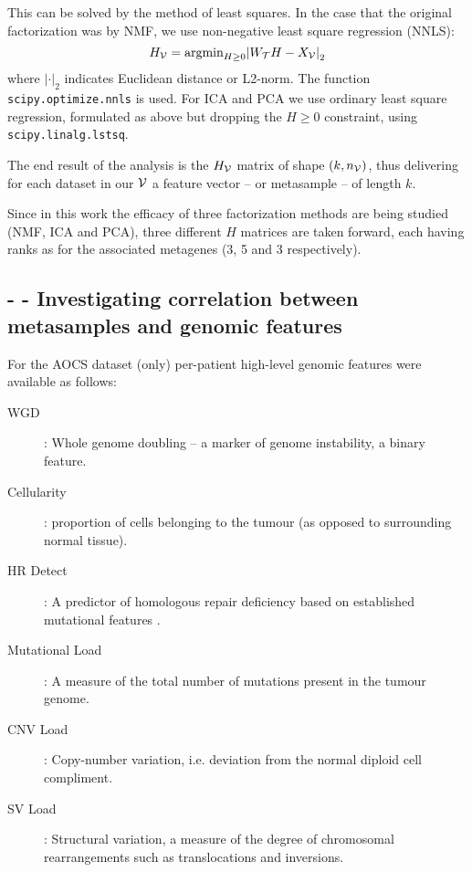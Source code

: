 \documentclass[tikz, 11pt,a4paper,oneside,fleqn, draft]{article}
\begin{document}
This can be solved by the method of least squares.  In the case that the original factorization was by NMF, we use non-negative least square regression (NNLS):
\begin{equation}
	H_{\mathcal{V}} = \mbox{argmin}_{H\geq 0}{\lvert W_{\mathcal{T}} H - X_{\mathcal{V}} \rvert}_2
	\label{eq_Hv_WdtXv}
\end{equation}
where ${\lvert \mathbf{\cdot} \rvert}_2$ indicates Euclidean distance or L2-norm.
The function {\tt scipy.optimize.nnls} is used.
For ICA and PCA we use ordinary least square regression, formulated as above but dropping the $H\geq 0$ constraint, using {\tt scipy.linalg.lstsq}.


The end result of the analysis is the $H_{\mathcal{V}}$ matrix of shape $(k, n_{\mathcal{V}})$, thus delivering for each dataset in our $\mathcal{V}$ a feature vector -- or metasample -- of length $k$. 

Since in this work the efficacy of three factorization methods are being studied (NMF, ICA and PCA), three different $H$ matrices are taken forward, each having ranks as for the associated metagenes (3, 5 and 3 respectively).



\subsection{- - Investigating correlation between metasamples and genomic features}
\label{sec-genomic-features}

For the AOCS dataset (only) per-patient high-level genomic features were available as follows:
\begin{description}
\item[WGD]: Whole genome doubling -- a marker of genome instability, a binary feature.
\item[Cellularity]: proportion of cells belonging to the tumour (as opposed to surrounding normal tissue).
\item[HR Detect]: A predictor of homologous repair deficiency based on established mutational features \cite{Ewing2020}.
\item[Mutational Load]: A measure of the total number of mutations present in the tumour genome.
\item[CNV Load]: Copy-number variation, i.e. deviation from the normal diploid cell compliment.
\item[SV Load]: Structural variation, a measure of the degree of chromosomal rearrangements such as translocations and inversions.
\end{description}
\end{document}
